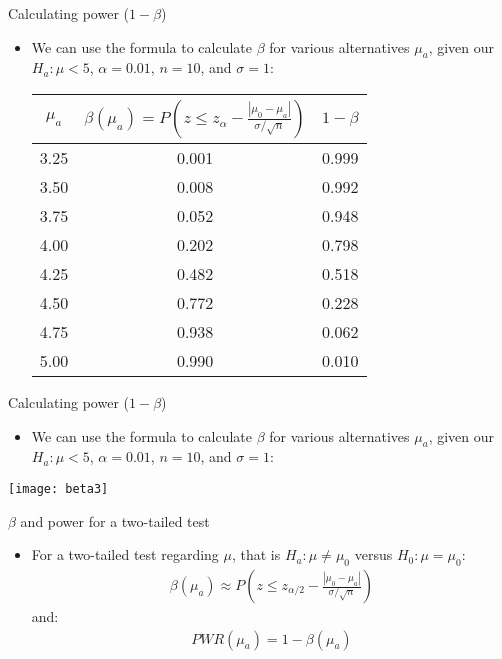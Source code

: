 \documentclass[xcolor=dvipsnames]{beamer}
\begin{document}
\begin{frame}{Calculating power ($1-\beta$)}
	\begin{itemize}
		\item We can use the formula to calculate $\beta$ for various alternatives $\mu_a$, given our $H_a: \mu < 5$, $\alpha = 0.01$, $n = 10$, and $\sigma = 1$: 
		\vspace{5mm}
		\begin{center}
			\begin{tabular}{|c|c|c|}
				\hline 
				$\mu_a$ & $\beta(\mu_a)= P\left(z \leq z_{\alpha} - \frac{|\mu_0 - \mu_a|}{\sigma / \sqrt{n}} \right)$ & $1-\beta$ \\ \hline \hline
				3.25 & 0.001 & 0.999 \\ \hline 
				3.50& 0.008 & 0.992\\ \hline 
				3.75& 0.052 & 0.948 \\ \hline 
				4.00& 0.202 & 0.798\\ \hline 
				4.25& 0.482 & 0.518\\ \hline 
				4.50& 0.772 & 0.228 \\ \hline 
				4.75& 0.938 & 0.062\\ \hline 
				5.00& 0.990 & 0.010\\ \hline 
			\end{tabular}
		\end{center}
	\end{itemize}
\end{frame}

\begin{frame}{Calculating power ($1-\beta$)}
	\begin{itemize}
		\item We can use the formula to calculate $\beta$ for various alternatives $\mu_a$, given our $H_a: \mu < 5$, $\alpha = 0.01$, $n = 10$, and $\sigma = 1$: 
	\end{itemize}
	\begin{center}
		\texttt{[image: beta3]}
	\end{center}
\end{frame}

\begin{frame}{$\beta$ and power for a two-tailed test}
	\begin{itemize}
		\item For a two-tailed test regarding $\mu$, that is $H_a: \mu \neq \mu_0$ versus $H_0: \mu = \mu_0$:
		\begin{gather*}
			\beta(\mu_a) \approx P\left(z \leq z_{\alpha/2} - \frac{|\mu_0 - \mu_a|}{\sigma / \sqrt{n}} \right)
		\end{gather*}
		and:
		\begin{gather*}
			PWR(\mu_a) = 1-\beta(\mu_a)
		\end{gather*}
	\end{itemize}
\end{frame}
\end{document}
